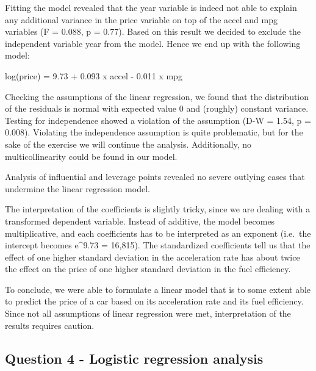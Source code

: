 \documentclass[]{article}
\begin{document}
Fitting the model revealed that the year variable is indeed not able to
explain any additional variance in the price variable on top of the
accel and mpg variables (F = 0.088, p = 0.77). Based on this result we
decided to exclude the independent variable year from the model. Hence
we end up with the following model:

log(price) = 9.73 + 0.093 x accel - 0.011 x mpg

Checking the assumptions of the linear regression, we found that the
distribution of the residuals is normal with expected value 0 and
(roughly) constant variance. Testing for independence showed a violation
of the assumption (D-W = 1.54, p = 0.008). Violating the independence
assumption is quite problematic, but for the sake of the exercise we
will continue the analysis. Additionally, no multicollinearity could be
found in our model.

Analysis of influential and leverage points revealed no severe outlying
cases that undermine the linear regression model.

The interpretation of the coefficients is slightly tricky, since we are
dealing with a transformed dependent variable. Instead of additive, the
model becomes multiplicative, and each coefficients has to be
interpreted as an exponent (i.e.~the intercept becomes e\^{}9.73 =
16,815). The standardized coefficients tell us that the effect of one
higher standard deviation in the acceleration rate has about twice the
effect on the price of one higher standard deviation in the fuel
efficiency.

To conclude, we were able to formulate a linear model that is to some
extent able to predict the price of a car based on its acceleration rate
and its fuel efficiency. Since not all assumptions of linear regression
were met, interpretation of the results requires caution.

\subsection{Question 4 - Logistic regression
analysis}\label{question-4---logistic-regression-analysis}
\end{document}
